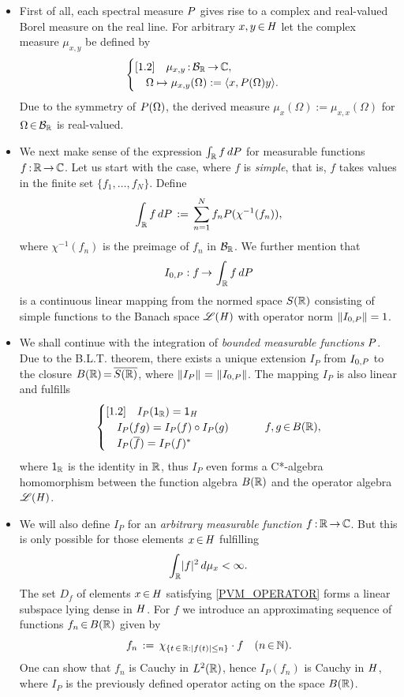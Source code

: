 \documentclass[11pt,twoside]{article}
\begin{document}
\begin{itemize}[leftmargin=12pt,itemsep=5pt]
\item[1.]
First of all,
each spectral measure ${P}$ gives rise
to a complex and real-valued Borel measure on the real line.
For arbitrary $x,y {\,\in\,} \mathit{H}$
let the complex measure $\mu_{x,y}$ be defined by
\[
\begin{cases}[1.2]
\quad \mu_{x,y} {\,:\,} {\mathcal{B}}_{{\mathbb{R}}} {\,\to\,} {\mathbb{C}},\\
\quad \Omega \mapsto \mu_{x,y}(\Omega) := \langle x,{P}(\Omega)y \rangle.\\
\end{cases}
\]
Due to the symmetry of ${P}(\Omega)$,
the derived measure
$\mu_x(\Omega) := \mu_{x,x}(\Omega)$ for $\Omega {\,\in\,} {\mathcal{B}}_{{\mathbb{R}}}$ is real-valued.

\item[2.]
We next make sense of the expression $\int_{{\mathbb{R}}} f \, dP$
for measurable functions $f{\,:\,}{\mathbb{R}} {\,\to\,} {\mathbb{C}}$.
Let us start with the case, where $f$ is \textit{simple},
that is,
$f$ takes values in the finite set $\{f_1,\ldots,f_N\}$.
Define
\[
\int_{{\mathbb{R}}} f \, d{P} \,:=\, \sum_{n=1}^N f_n {P}(\chi^{-1}(f_n)),
\]
where $\chi^{-1}(f_n)$ is the preimage of $f_n$ in ${\mathcal{B}}_{{\mathbb{R}}}$.
We further mention
that
\[
I_{0,{P}}:f {\,\to\,} \int_{{\mathbb{R}}} f \, d{P}
\]
is a continuous linear mapping from the normed space
$S({\mathbb{R}})$ consisting of simple functions
to the Banach space $\mathscr{L}(\mathit{H})$ with operator norm $\left\lVert I_{0,{P}} \right\rVert=1$.

\item[3.]
We shall continue with the integration
of \textit{bounded measurable functions} {\wrt} ${P}$.
Due to the B.L.T. theorem,
there exists a unique extension $I_P$ from $I_{0,{P}}$
to the closure $B({\mathbb{R}}) {\,=\,} \overline{S({\mathbb{R}})}$,
where $\left\lVert I_P \right\rVert {\,=\,} \left\lVert I_{0,P} \right\rVert$.
The mapping $I_P$ is also linear and fulfills
\[
\begin{cases}[1.2]
\quad I_P({\mathsf{1}}_{{\mathbb{R}}}) = {\mathsf{1}}_{\mathit{H}}\\
\quad I_P(fg) = I_P(f) \circ I_P(g)\\
\quad I_P(\overline{f}) = I_P(f)^*\\
\end{cases}
\quad \quad f,g {\,\in\,} B({\mathbb{R}}),
\]
where ${\mathsf{1}}_{{\mathbb{R}}}$ is the identity in ${\mathbb{R}}$,
thus $I_P$ even forms a C*-algebra homomorphism between
the function algebra $B({\mathbb{R}})$ and the operator algebra $\mathscr{L}(\mathit{H})$.

\item[4.]
We will also define $I_P$
for an \textit{arbitrary measurable function} $f{\,:\,}{\mathbb{R}} {\,\to\,} {\mathbb{C}}$.
But this is only possible for those elements $x {\,\in\,} \mathit{H}$ fulfilling
\begin{equation}\label{PVM_OPERATOR}
\int_{\R} \abs{f} ^2 \, d \mu_x < \infty.
\end{equation}
The set $D_f$ of elements $x {\,\in\,} \mathit{H}$ satisfying \eqref{PVM_OPERATOR}
forms a linear subspace lying dense in $\mathit{H}$.
For $f$ we introduce an approximating sequence of functions
$f_n {\,\in\,} B({\mathbb{R}})$ given by
\[
f_n \eqdef \chi_{ \{t \xeof \R: \abs{f(t)} \leq n\}} \cdot f
\quad (n \xeof \N).
\]
One can show that $f_n$ is Cauchy in $L^2({\mathbb{R}})$,
hence $I_P(f_n)$ is Cauchy in $\mathit{H}$,
where $I_P$ is the previously defined operator acting on the space $B({\mathbb{R}})$.


\end{itemize}
\end{document}
